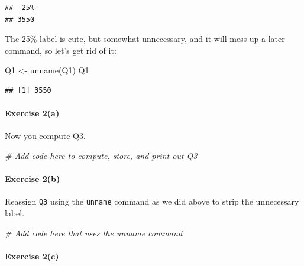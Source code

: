 \documentclass[
]{book}
\newenvironment{Shaded}{\begin{snugshade}}{\end{snugshade}}
\newcommand{\CommentTok}[1]{\textcolor[rgb]{0.56,0.35,0.01}{\textit{#1}}}
\newcommand{\FunctionTok}[1]{\textcolor[rgb]{0.00,0.00,0.00}{#1}}
\newcommand{\NormalTok}[1]{#1}
\newcommand{\OtherTok}[1]{\textcolor[rgb]{0.56,0.35,0.01}{#1}}
\begin{document}
\begin{verbatim}
##  25% 
## 3550
\end{verbatim}

The 25\% label is cute, but somewhat unnecessary, and it will mess up a later command, so let's get rid of it:

\begin{Shaded}
\begin{Highlighting}[]
\NormalTok{Q1 }\OtherTok{\textless{}{-}} \FunctionTok{unname}\NormalTok{(Q1)}
\NormalTok{Q1}
\end{Highlighting}
\end{Shaded}

\begin{verbatim}
## [1] 3550
\end{verbatim}

\hypertarget{exercise-2a}{%
\paragraph*{Exercise 2(a)}\label{exercise-2a}}

Now you compute Q3.

\begin{Shaded}
\begin{Highlighting}[]
\CommentTok{\# Add code here to compute, store, and print out Q3}
\end{Highlighting}
\end{Shaded}

\hypertarget{exercise-2b}{%
\paragraph*{Exercise 2(b)}\label{exercise-2b}}

Reassign \texttt{Q3} using the \texttt{unname} command as we did above to strip the unnecessary label.

\begin{Shaded}
\begin{Highlighting}[]
\CommentTok{\# Add code here that uses the unname command }
\end{Highlighting}
\end{Shaded}

\hypertarget{exercise-2c}{%
\paragraph*{Exercise 2(c)}\label{exercise-2c}}
\end{document}
